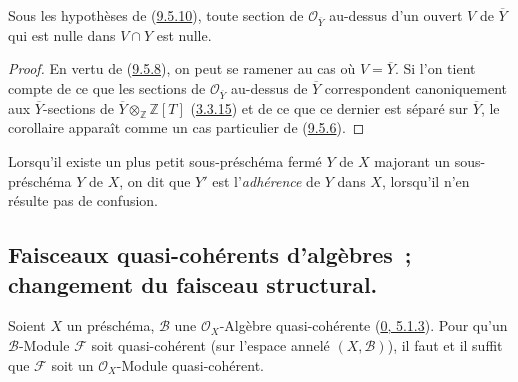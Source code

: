 \begin{corollary}[9.5.11]
\label{I.9.5.11-fr}
Sous les hypothèses de (\hyperref[I.9.5.10-fr]{9.5.10}), toute section de
$\mathscr{O}_{\overline{Y}}$ au-dessus d'un ouvert $V$ de $\overline{Y}$
qui est nulle dans $V\cap Y$ est nulle.
\end{corollary}

\begin{proof}
En vertu de (\hyperref[I.9.5.8-fr]{9.5.8}), on peut se ramener au cas où
$V=\overline{Y}$. Si l'on tient compte de ce que les sections de
$\mathscr{O}_{\overline{Y}}$ au-dessus de $\overline{Y}$ correspondent
canoniquement aux $\overline{Y}$-sections de
$\overline{Y}\otimes_{\mathbb{Z}}\mathbb{Z}[T]$
(\hyperref[I.3.3.15-fr]{3.3.15}) et de ce que ce dernier est séparé sur
$\overline{Y}$, le corollaire apparaît comme un cas particulier de
(\hyperref[I.9.5.6-fr]{9.5.6}).
\end{proof}

Lorsqu'il existe un plus petit sous-préschéma fermé $Y$ de $X$
majorant un sous-préschéma $Y$ de $X$, on dit que $Y'$ est
l'\emph{adhérence} de $Y$ dans $X$, lorsqu'il n'en résulte pas de
confusion.

\subsection{Faisceaux quasi-cohérents d'algèbres~; changement du faisceau
structural.}
\label{subsection:I.9.6-fr}

\begin{proposition}[9.6.1]
\label{I.9.6.1-fr}
Soient $X$ un préschéma, $\mathscr{B}$ une $\mathscr{O}_X$-Algèbre
quasi-cohérente (\hyperref[0.5.1.3-fr]{0, 5.1.3}). Pour qu'un
$\mathscr{B}$-Module $\mathscr{F}$ soit quasi-cohérent (sur l'espace
annelé $(X,\mathscr{B})$), il faut et il suffit que $\mathscr{F}$ soit un
$\mathscr{O}_X$-Module quasi-cohérent.
\end{proposition}

